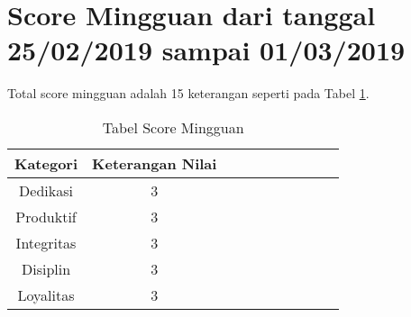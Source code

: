 \section{Score Mingguan dari tanggal 25/02/2019 sampai 01/03/2019}
Total score mingguan adalah 15 keterangan seperti pada Tabel \ref{table:scoremingguan}.
\begin{table}[!ht]
\centering
\begin{tabular}{ |c|c|c|c|c|c|c|c|c|c| }
\hline
Kategori & Keterangan Nilai \\
\hline
Dedikasi & 3 \\
\hline
Produktif & 3 \\
\hline
Integritas & 3 \\
\hline
Disiplin & 3 \\
\hline
Loyalitas & 3 \\
\hline
\end{tabular}
\caption{Tabel Score Mingguan}
\label{table:scoremingguan}
\end{table}



